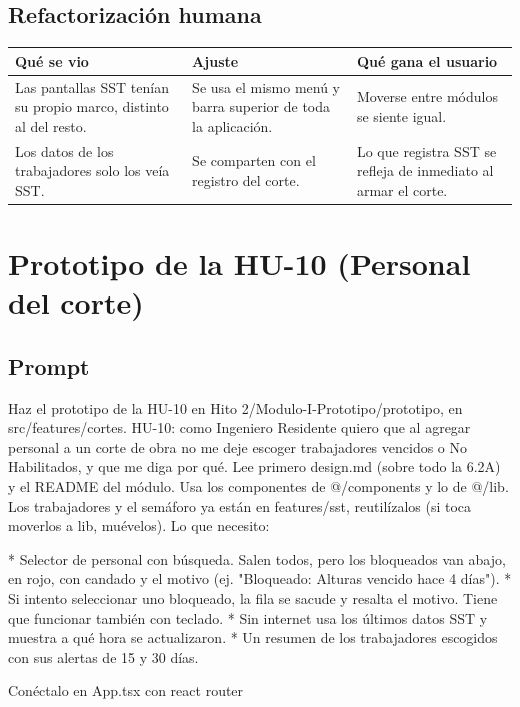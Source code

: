 \documentclass[11pt]{article}
\newenvironment{ajustes}[3]
  {\small\begin{longtable}{>{\raggedright\arraybackslash}p{4.5cm} >{\raggedright\arraybackslash}p{4.4cm} >{\raggedright\arraybackslash}p{6.4cm}}
   \toprule \textbf{#1} & \textbf{#2} & \textbf{#3} \\ \midrule \endhead
   \bottomrule \endfoot}
  {\end{longtable}\normalsize}
\begin{document}
\subsection{Refactorización humana}

\begin{ajustes}{Qué se vio}{Ajuste}{Qué gana el usuario}
Las pantallas SST tenían su propio marco, distinto al del resto. & Se usa el mismo menú y barra superior de toda la aplicación. & Moverse entre módulos se siente igual. \\
Los datos de los trabajadores solo los veía SST. & Se comparten con el registro del corte. & Lo que registra SST se refleja de inmediato al armar el corte. \\
\end{ajustes}

\section{Prototipo de la HU-10 (Personal del corte)}\label{sec:hu10}


\subsection{Prompt}

\begin{prompt}
Haz el prototipo de la HU-10 en Hito 2/Modulo-I-Prototipo/prototipo, en src/features/cortes.
HU-10: como Ingeniero Residente quiero que al agregar personal a un corte de obra no me
deje escoger trabajadores vencidos o No Habilitados, y que me diga por qué.
Lee primero design.md (sobre todo la 6.2A) y el README del módulo. Usa los componentes
de @/components y lo de @/lib. Los trabajadores y el semáforo ya están en features/sst,
reutilízalos (si toca moverlos a lib, muévelos).
Lo que necesito:

* Selector de personal con búsqueda. Salen todos, pero los bloqueados van abajo, en rojo,
con candado y el motivo (ej. "Bloqueado: Alturas vencido hace 4 días").
* Si intento seleccionar uno bloqueado, la fila se sacude y resalta el motivo. Tiene que
funcionar también con teclado.
* Sin internet usa los últimos datos SST y muestra a qué hora se actualizaron.
* Un resumen de los trabajadores escogidos con sus alertas de 15 y 30 días.

Conéctalo en App.tsx con react router
\end{prompt}
\end{document}
